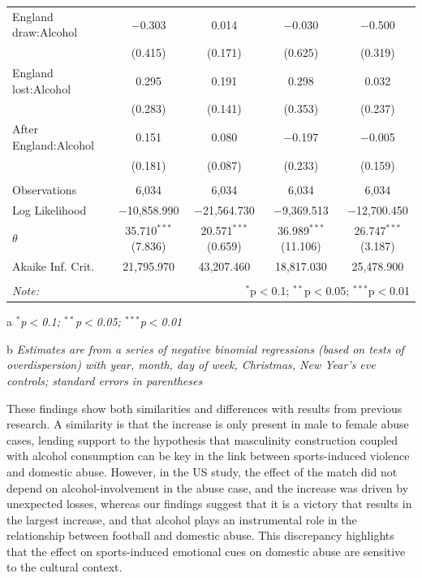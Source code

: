 \documentclass[12pt, letterpaper]{article}
\begin{document}
\begin{table}
{\begin{threeparttable}
\begin{tabular}{@{\extracolsep{5pt}}lcccc}
  England draw:Alcohol & $-$0.303 & 0.014 & $-$0.030 & $-$0.500 \\ 
  & (0.415) & (0.171) & (0.625) & (0.319) \\ 
  England lost:Alcohol & 0.295 & 0.191 & 0.298 & 0.032 \\ 
  & (0.283) & (0.141) & (0.353) & (0.237) \\ 
  After England:Alcohol & 0.151 & 0.080 & $-$0.197 & $-$0.005 \\ 
  & (0.181) & (0.087) & (0.233) & (0.159) \\ 
 \hline \\[-1.8ex] 
Observations & 6,034 & 6,034 & 6,034 & 6,034 \\ 
Log Likelihood & $-$10,858.990 & $-$21,564.730 & $-$9,369.513 & $-$12,700.450 \\ 
$\theta$ & 35.710$^{***}$  (7.836) & 20.571$^{***}$  (0.659) & 36.989$^{***}$  (11.106) & 26.747$^{***}$  (3.187) \\ 
Akaike Inf. Crit. & 21,795.970 & 43,207.460 & 18,817.030 & 25,478.900 \\ 
\hline 
\hline \\[-1.8ex] 
\textit{Note:}  & \multicolumn{4}{r}{$^{*}$p$<$0.1; $^{**}$p$<$0.05; $^{***}$p$<$0.01} \\ 
\end{tabular} 
\begin{tablenotes}
      \item[a] \textit{$^{*}$p$<$0.1; $^{**}$p$<$0.05; $^{***}$p$<$0.01}
      \item[b] \textit{Estimates are from a series of negative binomial regressions (based on tests of overdispersion)  with year, month, day of week, Christmas, New Year's eve controls; standard errors in parentheses}
    \end{tablenotes}
\end{threeparttable} }
\end{table}

These findings show both similarities and differences with results from previous research. A similarity is that the increase is only present in male to female abuse cases, lending support to the hypothesis that masculinity construction coupled with alcohol consumption can be key in the link between sports-induced violence and domestic abuse. However, in the US study\autocite{Card2011}, the effect of the match did not depend on alcohol-involvement in the abuse case, and the increase was driven by unexpected losses, whereas our findings suggest that it is a victory that results in the largest increase, and that alcohol plays an instrumental role in the relationship between football and domestic abuse. This discrepancy highlights that the effect on sports-induced emotional cues on domestic abuse are sensitive to the cultural context. 
\end{document}
